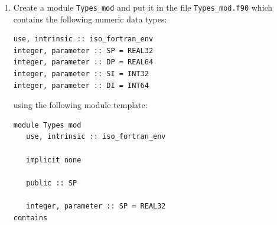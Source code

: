 \documentclass[12pt]{article}
\begin{document}
\begin{enumerate}
\item Create a module \texttt{Types\_mod} and put it in the file \texttt{Types\_mod.f90} which 
contains the following numeric data types:
\begin{verbatim}
use, intrinsic :: iso_fortran_env
integer, parameter :: SP = REAL32
integer, parameter :: DP = REAL64
integer, parameter :: SI = INT32
integer, parameter :: DI = INT64
\end{verbatim}
using the following module template: 
\begin{verbatim}
module Types_mod
   use, intrinsic :: iso_fortran_env

   implicit none

   public :: SP

   integer, parameter :: SP = REAL32
contains


\end{verbatim}
\end{enumerate}
\end{document}
